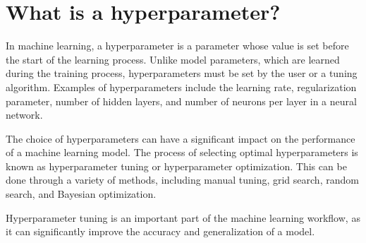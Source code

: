 \section{What is a hyperparameter?}
In machine learning, a hyperparameter is a parameter whose value is set before the start of the learning process. Unlike model parameters, which are learned during the training process, hyperparameters must be set by the user or a tuning algorithm. Examples of hyperparameters include the learning rate, regularization parameter, number of hidden layers, and number of neurons per layer in a neural network.

The choice of hyperparameters can have a significant impact on the performance of a machine learning model. The process of selecting optimal hyperparameters is known as hyperparameter tuning or hyperparameter optimization. This can be done through a variety of methods, including manual tuning, grid search, random search, and Bayesian optimization.

Hyperparameter tuning is an important part of the machine learning workflow, as it can significantly improve the accuracy and generalization of a model.

